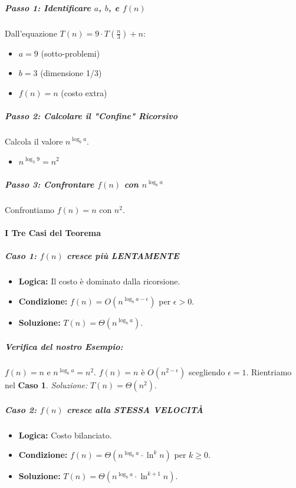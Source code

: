 \begin{example}[Guida Passo-Passo: $T(n) = 9 \cdot T(\frac{n}{3}) + n$]
    
    \subparagraph{Passo 1: Identificare $a$, $b$, e $f(n)$}
    Dall'equazione $T(n) = 9 \cdot T(\frac{n}{3}) + n$:
    \begin{itemize}
        \item $a = 9$ (sotto-problemi)
        \item $b = 3$ (dimensione 1/3)
        \item $f(n) = n$ (costo extra)
    \end{itemize}
    
    
    \subparagraph{Passo 2: Calcolare il "Confine" Ricorsivo}
    Calcola il valore $n^{\log_b{a}}$.
    \begin{itemize}
        \item $n^{\log_3 9} = n^2$
    \end{itemize}
    
    \subparagraph{Passo 3: Confrontare $f(n)$ con $n^{\log_b{a}}$}
    Confrontiamo $f(n) = n$ con $n^2$.
    
    \paragraph{I Tre Casi del Teorema}
    \subparagraph{Caso 1: $f(n)$ cresce più LENTAMENTE}
    \begin{itemize}
        \item \textbf{Logica:} Il costo è dominato dalla ricorsione.
        \item \textbf{Condizione:} $f(n) = O(n^{\log_b{a}-\epsilon})$ per $\epsilon > 0$.
        \item \textbf{Soluzione:} $T(n) = \Theta(n^{\log_b{a}})$.
    \end{itemize}
    
    \subparagraph{Verifica del nostro Esempio:}
    $f(n) = n$ e $n^{\log_b{a}} = n^2$.
    $f(n) = n$ è $O(n^{2-\epsilon})$ scegliendo $\epsilon=1$.
    Rientriamo nel \textbf{Caso 1}.
    \emph{Soluzione:} $T(n) = \Theta(n^2)$.
    
    \subparagraph{Caso 2: $f(n)$ cresce alla STESSA VELOCITÀ}
    \begin{itemize}
        \item \textbf{Logica:} Costo bilanciato.
        \item \textbf{Condizione:} $f(n) = \Theta(n^{\log_b{a}}\cdot \ln^k{n})$ per $k \geq 0$.
        \item \textbf{Soluzione:} $T(n) = \Theta(n^{\log_b{a}} \cdot \ln^{k+1}{n})$.
    \end{itemize}
    

\end{example}
